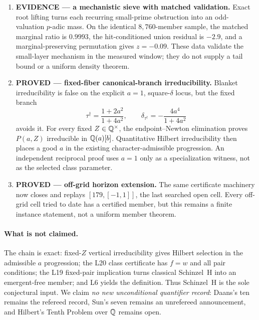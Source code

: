 \begin{enumerate}
\item \textbf{EVIDENCE --- a mechanistic sieve with matched validation.}
Exact root lifting turns each recurring small-prime obstruction into an
odd-valuation $p$-adic mass.  On the identical $8{,}760$-member sample, the
matched marginal ratio is $0.9993$, the hit-conditioned union residual is
$-2.9$, and a marginal-preserving permutation gives $z=-0.09$.  These data
validate the small-layer mechanism in the measured window; they do not
supply a tail bound or a uniform density theorem.

\item \textbf{PROVED --- fixed-fiber canonical-branch irreducibility.}
Blanket irreducibility is false on the explicit $a=1$,
square-$\delta$ locus, but the fixed branch
\[
 \tau^\dagger=\frac{1+2a^2}{1+4a^2},
 \qquad \delta_{\tau^\dagger}=-\frac{4a^4}{1+4a^2}
\]
avoids it.  For every fixed $Z\in\mathbb{Q}^\times$, the endpoint--Newton
elimination proves $P(a,Z)$ irreducible in $\mathbb{Q}(a)[b]$.  Quantitative
Hilbert irreducibility then places a good $a$ in the existing
character-admissible progression.  An independent reciprocal proof uses
$a=1$ only as a specialization witness, not as the selected class
parameter.

\item \textbf{PROVED --- off-grid horizon extension.}
The same certificate machinery now closes and replays
$[179,[-1,1]]$, the last searched open cell.  Every off-grid cell tried to
date has a certified member, but this remains a finite instance statement,
not a uniform member theorem.
\end{enumerate}

\paragraph{What is not claimed.}
The chain is exact: fixed-$Z$ vertical irreducibility gives Hilbert
selection in the admissible $a$ progression; the L20 class certificate
has $f=w$ and all pair conditions; the L19 fixed-pair implication turns
classical Schinzel~H into an emergent-free member; and L6 yields the
definition.  Thus Schinzel~H is the sole conjectural input.  We claim
\emph{no new unconditional quantifier record}: Daans's ten remains the
refereed record, Sun's seven remains an unrefereed announcement, and
Hilbert's Tenth Problem over $\mathbb{Q}$ remains open.
